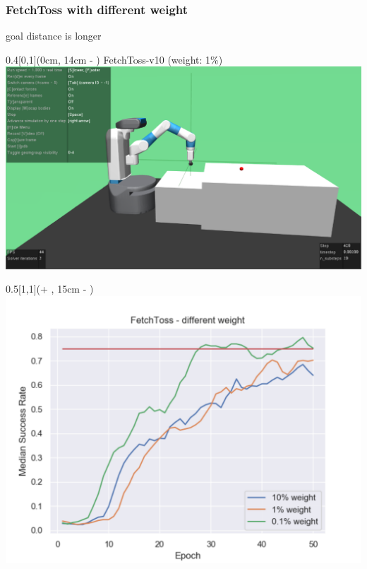 




\begin{frame}
	\frametitle{FetchToss with different weight}	
	\vspace{1cm}
	
	goal distance is longer
	
	\begin{textblock*}{0.4\paperwidth}[0,1](0cm, 14cm - \PraesentationSeitenrand)%
		FetchToss-v10 (weight: 1\%)
		\includegraphics[width=0.4\paperwidth]{./Ressourcen/Figures/FetchToss-v10.pdf}
		
	\end{textblock*}
	
	
	\begin{textblock*}{0.5\paperwidth}[1,1](\textwidth + \PraesentationSeitenrand, 15cm - \PraesentationSeitenrand)%
		\includegraphics[width=0.5\paperwidth]{./Ressourcen/Figures/fig_FetchToss_weight.pdf}
	\end{textblock*}	
	
	
\end{frame}
\clearpage


